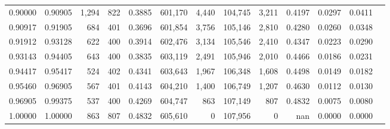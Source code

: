 \begin{tabular}{rrrrrrrrrrrrr}
0.90000 & 0.90905 &  1,294 &   822 &                                     0.3885 & 601,170 &   4,440 & 104,745 &   3,211 & 0.4197 & 0.0297 & 0.0411 \\
0.90917 & 0.91905 &    684 &   401 &                                     0.3696 & 601,854 &   3,756 & 105,146 &   2,810 & 0.4280 & 0.0260 & 0.0348 \\
0.91912 & 0.93128 &    622 &   400 &                                     0.3914 & 602,476 &   3,134 & 105,546 &   2,410 & 0.4347 & 0.0223 & 0.0290 \\
0.93143 & 0.94405 &    643 &   400 &                                     0.3835 & 603,119 &   2,491 & 105,946 &   2,010 & 0.4466 & 0.0186 & 0.0231 \\
0.94417 & 0.95417 &    524 &   402 &                                     0.4341 & 603,643 &   1,967 & 106,348 &   1,608 & 0.4498 & 0.0149 & 0.0182 \\
0.95460 & 0.96905 &    567 &   401 &                                     0.4143 & 604,210 &   1,400 & 106,749 &   1,207 & 0.4630 & 0.0112 & 0.0130 \\
0.96905 & 0.99375 &    537 &   400 &                                     0.4269 & 604,747 &     863 & 107,149 &     807 & 0.4832 & 0.0075 & 0.0080 \\
1.00000 & 1.00000 &    863 &   807 &                                     0.4832 & 605,610 &       0 & 107,956 &       0 &    nan & 0.0000 & 0.0000 \\
\bottomrule
\end{tabular}
